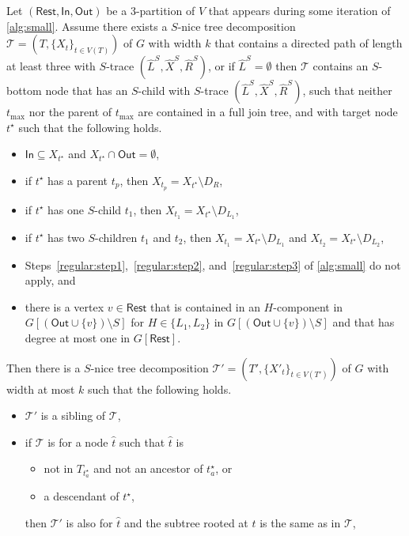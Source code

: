 \documentclass[a4paper,UKenglish,cleveref, autoref, thm-restate, numberwithinsect]{lipics-v2021}
\newcommand{\slim}{\text{slim}\xspace}
\newcommand{\topheavy}{\text{top-heavy}\xspace}
\newcommand{\In}{\mathsf{In}}
\newcommand{\Out}{\mathsf{Out}}
\newcommand{\Rest}{\mathsf{Rest}}
\begin{document}
\begin{lemma}\label{lem:regularstep4}
Let $(\Rest,\In,\Out)$ be a 3-partition of $V$ that appears during some iteration of \cref{alg:small}. 
Assume there exists a \slim $S$-nice tree decomposition $\mathcal{T}=(T,\{X_t\}_{t\in V(T)})$ of $G$ with width $k$ that contains a directed path of length at least three with $S$-trace $(\hat{L}^S, \hat{X}^S, \hat{R}^S)$, or if $\hat{L}^S=\emptyset$ then $\mathcal{T}$ contains an $S$-bottom node that has an $S$-child with $S$-trace $(\hat{L}^S, \hat{X}^S, \hat{R}^S)$, such that neither $t_{\max}$ nor the parent of $t_{\max}$ are contained in a full join tree, and with target node ${t^\star}$ such that the following holds.
\begin{itemize}
\item $\In\subseteq X_{t^\star}$ and $X_{t^\star}\cap \Out=\emptyset$,
            \item if $t^\star$ has a parent $t_p$, then $X_{t_p}=X_{t^\star}\setminus D_R$, 
    \item if $t^\star$ has one $S$-child $t_1$, then $X_{t_1}=X_{t^\star}\setminus D_{L_1}$, 
    \item if $t^\star$ has two $S$-children $t_1$ and $t_2$, then $X_{t_1}=X_{t^\star}\setminus D_{L_1}$ and $X_{t_2}=X_{t^\star}\setminus D_{L_2}$, 
    \item Steps~\ref{regular:step1},~\ref{regular:step2}, and~\ref{regular:step3} of \cref{alg:small} do not apply, and
    \item there is a vertex $v\in\Rest$ that is contained in an $H$-component in $G[(\Out\cup\{v\})\setminus S]$ for $H\in\{L_1,L_2\}$ in $G[(\Out\cup\{v\})\setminus S]$ and that has degree at most one in $G[\Rest]$.
\end{itemize} 
Then there is a \slim $S$-nice tree decomposition $\mathcal{T}'=(T',\{X'_t\}_{t\in V(T')})$ of $G$ with width at most $k$ 
such that the following holds.
\begin{itemize}
\item $\mathcal{T}'$ is a sibling of $\mathcal{T}$,
\item if $\mathcal{T}$ is \topheavy for a node $\hat{t}$ such that $\hat{t}$ is
\begin{itemize}
    \item not in $T_{t^\star_a}$ and not an ancestor of $t^\star_a$, or
    \item a descendant of $t^\star$,
\end{itemize}
then $\mathcal{T}'$ is also \topheavy for $\hat{t}$ and the subtree rooted at $\hat{t}$ is the same as in $\mathcal{T}$,

\end{itemize}
\end{lemma}
\end{document}
